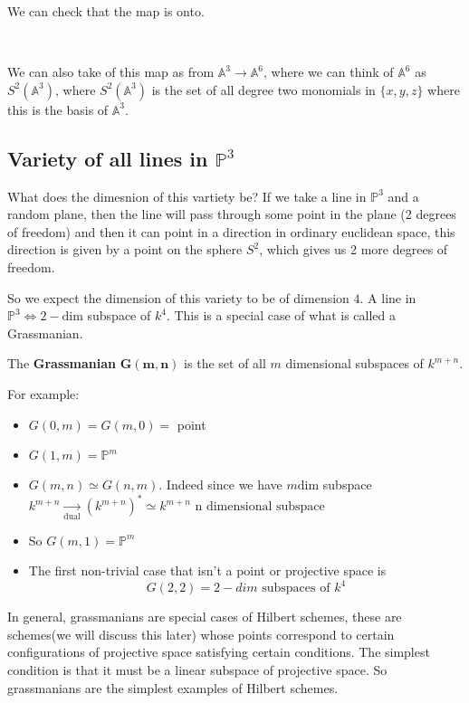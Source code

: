 We can check that the map is onto.


\

We can also take of this map as from $\mathbb{A}^3\rightarrow \mathbb{A}^6$, where we can think of $\mathbb{A}^6$ as $S^2(\mathbb{A}^3)$, where $S^2(\mathbb{A}^3)$ is the set of all degree two monomials in $\{x,y,z\}$ where this is the basis of $\mathbb{A}^3$.



\subsection{Variety of all lines in $\mathbb{P}^3$}

What does the dimesnion of this vartiety be? If we take a line in $\mathbb{P}^3$ and a random plane, then the line will pass through some point in the plane (2 degrees of freedom) and then it can point in a direction in ordinary euclidean space, this direction is given by a point on the sphere $S^2$, which gives us 2 more degrees of freedom.

So we expect the dimension of this variety to be of dimension $4$. A line in $\mathbb{P}^3 \iff 2-\text{dim}$ subspace of $k^4$. This is a special case of what is called a Grassmanian.

\begin{definition}
    The \textbf{Grassmanian} $\mathbf{G(m,n)}$ is the set of all $m$ dimensional subspaces of $k^{m+n}$.

    For example:\begin{itemize}
        \item $G(0,m) = G(m,0) = $ point
        \item $G(1,m) = \mathbb{P}^m$
        \item $G(m,n) \simeq G(n,m)$. Indeed since we have $m \text{dim}$ subspace $k^{m+n} \underset{\text{dual}}{\rightarrow} (k^{m+n})^\ast \simeq k^{m+n} \text{ n dimensional subspace}$
        \item So $G(m,1) = \mathbb{P}^m$
        \item The first non-trivial case that isn't a point or projective space is \[G(2,2) = \text{2}-dim \text{ subspaces of }k^4\]
    \end{itemize}
    In general, grassmanians are special cases of Hilbert schemes, these are schemes(we will discuss this later) whose points correspond to certain configurations of projective space satisfying certain conditions. The simplest condition is that it must be a linear subspace of projective space. So grassmanians are the simplest examples of Hilbert schemes. 
\end{definition}

